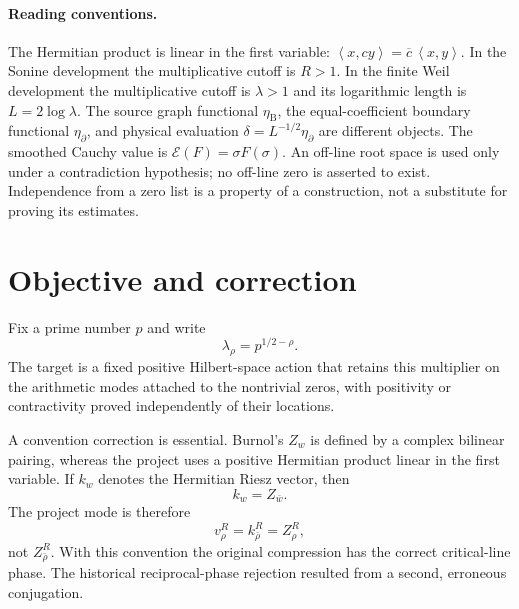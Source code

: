 \documentclass[11pt]{article}
\theoremstyle{remark}
\newcommand{\ip}[2]{\left\langle #1,#2\right\rangle}
\begin{document}
\paragraph{Reading conventions.}
The Hermitian product is linear in the first variable:
$\ip{x}{cy}=\overline c\,\ip{x}{y}$.
In the Sonine development the multiplicative cutoff is $R>1$.
In the finite Weil development the multiplicative cutoff is $\lambda>1$
and its logarithmic length is $L=2\log\lambda$.
The source graph functional $\eta_{\mathrm B}$, the equal-coefficient
boundary functional $\eta_\partial$, and physical evaluation
$\delta=L^{-1/2}\eta_\partial$ are different objects.
The smoothed Cauchy value is $\mathscr E(F)=\sigma F(\sigma)$.
An off-line root space is used only under a contradiction hypothesis;
no off-line zero is asserted to exist. Independence from a zero list is
a property of a construction, not a substitute for proving its estimates.

\clearpage
\tableofcontents
\clearpage
\section{Objective and correction}
Fix a prime number $p$ and write
\[
  \lambda_\rho=p^{1/2-\rho}.
\]
The target is a fixed positive Hilbert-space action that retains this multiplier on the arithmetic modes attached to the nontrivial zeros, with positivity or contractivity proved independently of their locations.

A convention correction is essential. Burnol's $Z_w$ is defined by a complex bilinear pairing, whereas the project uses a positive Hermitian product linear in the first variable. If $k_w$ denotes the Hermitian Riesz vector, then
\[
  k_w=Z_{\bar w}.
\]
The project mode is therefore
\[
  v_\rho^R=k_{\bar\rho}^R=Z_\rho^R,
\]
not $Z_{\bar\rho}^R$. With this convention the original compression has the correct critical-line phase. The historical reciprocal-phase rejection resulted from a second, erroneous conjugation.
\end{document}
